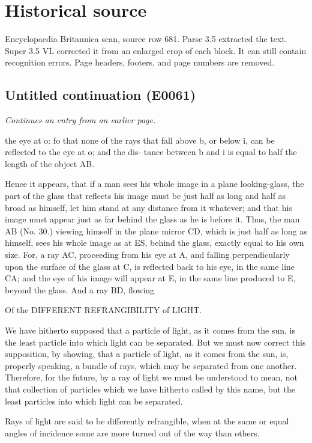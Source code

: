 \documentclass{article}
\begin{document}
\section*{Historical source}
Encyclopaedia Britannica scan, source row 681. Parse 3.5 extracted the text. Super 3.5 VL corrected it from an enlarged crop of each block. It can still contain recognition errors.
Page headers, footers, and page numbers are removed.

\subsection*{Untitled continuation (E0061)}
\textit{Continues an entry from an earlier page.}

the eye at o: fo that none of the rays that fall above b, or below i, can be reflected to the eye at o; and the dis- tance between b and i is equal to half the length of the object AB.

Hence it appears, that if a man sees his whole image in a plane looking-glass, the part of the glass that reflects his image must be just half as long and half as broad as himself, let him stand at any distance from it whatever; and that his image must appear just as far behind the glass as he is before it. Thus, the man AB (No. 30.) viewing himself in the plane mirror CD, which is just half as long as himself, sees his whole image as at ES, behind the glass, exactly equal to his own size. For, a ray AC, proceeding from his eye at A, and falling perpendicularly upon the surface of the glass at C, is reflected back to his eye, in the same line CA; and the eye of his image will appear at E, in the same line produced to E, beyond the glass. And a ray BD, flowing

Of the DIFFERENT REFRANGIBILITY of LIGHT.

We have hitherto supposed that a particle of light, as it comes from the sun, is the least particle into which light can be separated. But we must now correct this supposition, by showing, that a particle of light, as it comes from the sun, is, properly speaking, a bundle of rays, which may be separated from one another. Therefore, for the future, by a ray of light we must be understood to mean, not that collection of particles which we have hitherto called by this name, but the least particles into which light can be separated.

Rays of light are said to be differently refrangible, when at the same or equal angles of incidence some are more turned out of the way than others.
\end{document}
